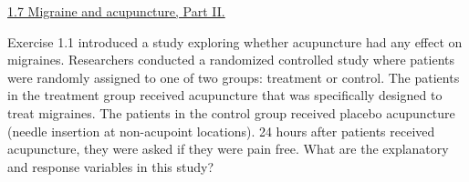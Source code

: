 \documentclass[10pt,letterpaper,unboxed,cm]{exam}
\begin{document}
\begin{questions}



	\question \underline{1.7 Migraine and acupuncture, Part II.}

    Exercise 1.1 introduced a study exploring whether acupuncture had any effect on migraines. Researchers conducted a randomized controlled study where patients were randomly assigned to one of two groups: treatment or control. The patients in the treatment group received acupuncture that was specifically designed to treat migraines. The patients in the control group received placebo acupuncture (needle insertion at non-acupoint locations). 24 hours after patients received acupuncture, they were asked if they were pain free. What are the explanatory and response variables in
    this study?
    

\end{questions}
\end{document}
